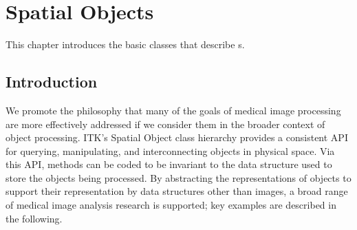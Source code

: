
\chapter{Spatial Objects}
\label{sec:SpatialObjects}

This chapter introduces the basic classes that describe
s.

\section{Introduction}
\label{Introduction}

We promote the philosophy that many of the goals of medical image processing 
are more effectively addressed if we consider them in the broader context 
of object processing. ITK's Spatial Object class hierarchy provides a 
consistent API for querying, manipulating, and interconnecting objects in 
physical space.   Via this API, methods can be coded to be invariant to 
the data structure used to store the objects being processed.   By 
abstracting the representations of objects to support their representation 
by data structures other than images, a broad range of medical image 
analysis research is supported; key examples are described in the following.

